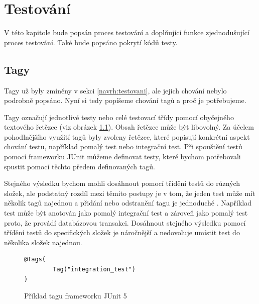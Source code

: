 \chapter{Testování}\label{chapter:testovani}
V této kapitole bude popsán proces testování a doplňující funkce zjednodušující proces testování. Také bude popsáno pokrytí kódů testy.

\section{Tagy}\label{testovani:tagy}
    Tagy už byly zmíněny v sekci \ref{navrh:testovani}, ale jejich chování nebylo podrobně popsáno. Nyní si tedy popíšeme chování tagů a proč je potřebujeme. 
    
    Tagy označují jednotlivé testy nebo celé testovací třídy pomocí obyčejného textového řetězce (viz obrázek \ref{code:tag-junit-5}). Obsah řetězce může být libovolný. Za účelem pohodlnějšího využití tagů byly zvoleny řetězce, které popisují konkrétní aspekt chování testu, například pomalý test nebo integrační test. Při spouštění testů pomocí frameworku JUnit můžeme definovat testy, které bychom potřebovali spustit pomocí těchto předem definovaných tagů.
    
    Stejného výsledku bychom mohli dosáhnout pomocí třídění testů do různých složek, ale podstatný rozdíl mezi těmito postupy je v tom, že jeden test může mít několik tagů najednou a přidání nebo odstranění tagu je jednoduché . Například test může být anotován jako pomalý integrační test a zároveň jako pomalý test proto, že provádí databázovou transakci. Dosáhnout stejného výsledku pomocí třídění testů do specifických složek je náročnější a nedovoluje umístit test do několika složek najednou.
    \begin{figure}
        \begin{verbatim}
@Tags(
        Tag("integration_test")
)
        \end{verbatim}
        \caption{Příklad tagu frameworku JUnit 5} 
        \label{code:tag-junit-5}
    \end{figure}
    
